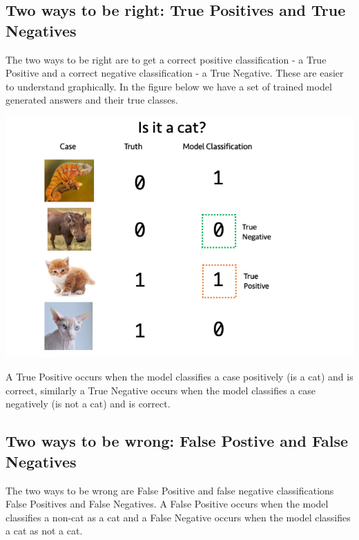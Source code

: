 \documentclass[
]{book}
\begin{document}
\hypertarget{two-ways-to-be-right-true-positives-and-true-negatives}{%
\subsection{Two ways to be right: True Positives and True Negatives}\label{two-ways-to-be-right-true-positives-and-true-negatives}}

The two ways to be right are to get a correct positive classification - a True Positive and a correct negative classification - a True Negative. These are easier to understand graphically. In the figure below we have a set of trained model generated answers and their true classes.

\includegraphics{figs/tptn.png}

A True Positive occurs when the model classifies a case positively (is a cat) and is correct, similarly a True Negative occurs when the model classifies a case negatively (is not a cat) and is correct.

\hypertarget{two-ways-to-be-wrong-false-postive-and-false-negatives}{%
\subsection{Two ways to be wrong: False Postive and False Negatives}\label{two-ways-to-be-wrong-false-postive-and-false-negatives}}

The two ways to be wrong are False Positive and false negative classifications False Positives and False Negatives. A False Positive occurs when the model classifies a non-cat as a cat and a False Negative occurs when the model classifies a cat as not a cat.
\end{document}
